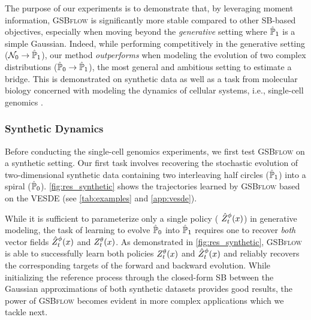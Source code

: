 The purpose of our experiments is to demonstrate that, by leveraging moment information, \textsc{GSBflow} is significantly more stable compared to other \acrshort{SB}-based objectives, especially when moving beyond the \emph{generative} setting where $\hat{\mathbb{P}}_{ {1}}$ is a simple Gaussian. Indeed, while performing competitively in the {generative} setting ($\mathcal{N}_0 \rightarrow \hat{\mathbb{P}}_{ {1}}$), our method \textit{outperforms} when modeling the evolution of two complex distributions ($\hat{\mathbb{P}}_{ {0} } \rightarrow \hat{\mathbb{P}}_{ {1}}$), the most general and ambitious setting to estimate a bridge. This is demonstrated on synthetic data as well as a task from molecular biology concerned with modeling the dynamics of cellular systems, i.e., single-cell genomics \citep{macosko2015highly, frangieh2021multimodal, kulkarni2019beyond}.

\subsubsection{Synthetic Dynamics}

\label{sec:synthetic}
Before conducting the single-cell genomics experiments, we first test \textsc{GSBflow} on a synthetic setting. 
Our first task involves recovering the stochastic evolution of two-dimensional synthetic data containing two interleaving half circles ($\hat{\mathbb{P}}_{ {1}}$) into a spiral ($\hat{\mathbb{P}}_{ {0} }$). 
\cref{fig:res_synthetic} shows the trajectories learned by \textsc{GSBflow} based on the \acrshort{VESDE} (see \cref{tab:examples} and \cref{app:vesde}). 


While it is sufficient to parameterize only a single policy ({\color{blue} $\SBb$}) in generative modeling, the task of learning to evolve $\hat{\mathbb{P}}_{ {0} }$ into $\hat{\mathbb{P}}_{ {1}}$ requires one to recover \emph{both} vector fields {\color{blue} $\SBb$} and {\color{pink} $\SBf$}.
As demonstrated in \cref{fig:res_synthetic}, \textsc{GSBflow} is able to successfully learn both policies {\color{pink} $\SBf$} and {\color{blue} $\SBb$} and reliably recovers the corresponding targets of the forward and backward evolution. While initializing the reference process through the closed-form SB between the Gaussian approximations of both synthetic datasets provides good results, the power of \textsc{GSBflow} becomes evident in more complex applications which we tackle next.


